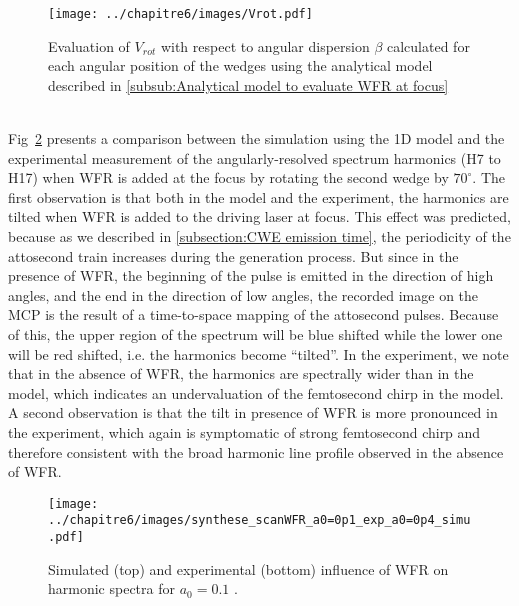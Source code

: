 \begin{figure}[H]
\centering
\texttt{[image: ../chapitre6/images/Vrot.pdf]}\\
\caption{\label{fig:Vrot} Evaluation of $V_{rot}$ with respect to angular dispersion $\beta$ calculated for each angular position of the wedges using the analytical model described in \ref{subsub:Analytical model to evaluate WFR at focus} }
\end{figure}

\noindent {}\\
\noindent Fig~\ref{fig:hhgfield_verticalspectral} presents a comparison between the simulation using the 1D model and the experimental measurement of the angularly-resolved spectrum harmonics (H7 to H17) when WFR is added at the focus by rotating the second wedge by $70^{\circ}$. The first observation is that both in the model and the experiment, the harmonics are tilted when WFR is added to the driving laser at focus. This effect was predicted, because as we described in \ref{subsection:CWE emission time}, the periodicity of the attosecond train increases during the generation process. But since in the presence of WFR, the beginning of the pulse is emitted in the direction of high angles, and the end in the direction of low angles, the recorded image on the MCP is the result of a time-to-space mapping of the attosecond pulses. Because of this, the upper region of the spectrum will be blue shifted while the lower one will be red shifted, i.e. the harmonics become ``tilted''. In the experiment, we note that in the absence of WFR, the harmonics are spectrally wider than in the model, which indicates an undervaluation of the femtosecond chirp in the model. A second observation is that the tilt in presence of WFR is more pronounced in the experiment, which again is symptomatic of strong femtosecond chirp and therefore consistent with the broad harmonic line profile observed in the absence of WFR. 


\begin{figure}[H]
\centering
\texttt{[image: ../chapitre6/images/synthese\_scanWFR\_a0=0p1\_exp\_a0=0p4\_simu.pdf]}\\
\caption{\label{fig:hhgfield_verticalspectral} Simulated (top) and experimental (bottom) influence of WFR on harmonic spectra for $a_0 = 0.1$ .}%
\end{figure}


